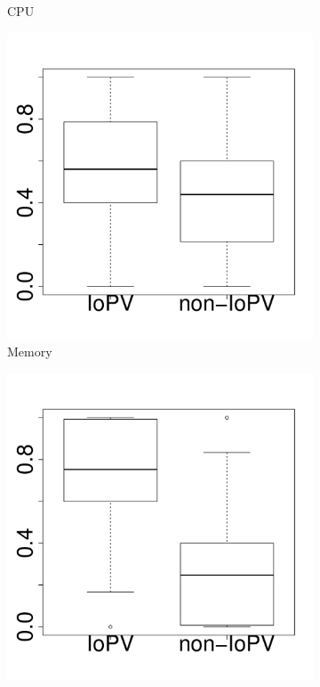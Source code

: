\begin{figure}[t]
\begin{subfigure}{0.19\textwidth}
                \caption{CPU}
        \end{subfigure}%
        \begin{subfigure}{0.19\textwidth}
                \includegraphics[width=\linewidth]{Figures/mem-cassandra-boxplot.pdf}
                \caption{Memory}
        \end{subfigure}%
        \begin{subfigure}{0.19\textwidth}
                \includegraphics[width=\linewidth]{Figures/ioread-cassandra-boxplot.pdf}

\end{subfigure}
\end{figure}
